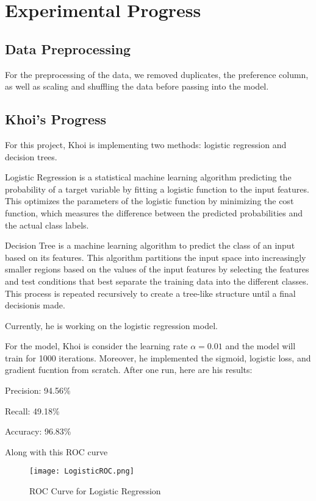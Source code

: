 \section{Experimental Progress}

\subsection{Data Preprocessing}

For the preprocessing of the data, we removed duplicates, the preference column, as well as scaling and shuffling the data before passing into the model.

\subsection{Khoi's Progress}

For this project, Khoi is implementing two methods: logistic regression and decision trees.

Logistic Regression is a statistical machine learning algorithm predicting the probability of a target variable by fitting a logistic function to the input features. This optimizes the parameters of the logistic function by minimizing the cost function, which measures the difference between the predicted probabilities and the actual class labels.

Decision Tree is a machine learning algorithm to predict the class of an input based on its features. This algorithm partitions the input space into increasingly smaller regions based on the values of the input features by selecting the features and test conditions that best separate the training data into the different classes. This process is repeated recursively to create a tree-like structure until a final decisionis made.

Currently, he is working on the logistic regression model.

For the model, Khoi is consider the learning rate $\alpha = 0.01$ and the model will train for 1000 iterations. Moreover, he implemented the sigmoid, logistic loss, and gradient fucntion from scratch. After one run, here are his results:

Precision: 94.56\%

Recall: 49.18\%

Accuracy: 96.83\%

Along with this ROC curve

\begin{figure}[H] %
    \centering
    \texttt{[image: LogisticROC.png]}
    \caption{ROC Curve for Logistic Regression}
\end{figure}

